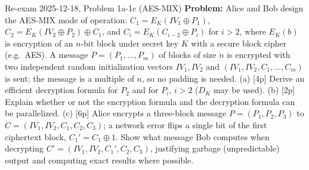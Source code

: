 \documentclass[12pt, a4paper]{article}
\begin{document}
\begin{practicebox}{Re-exam 2025-12-18, Problem 1a-1c (AES-MIX)}
\textbf{Problem:} Alice and Bob design the AES-MIX mode of operation: $C_1 = E_K(IV_1 \oplus P_1)$, $C_2 = E_K(IV_2 \oplus P_2) \oplus C_1$, and $C_i = E_K(C_{i-2} \oplus P_i)$ for $i > 2$, where $E_K(b)$ is encryption of an $n$-bit block under secret key $K$ with a secure block cipher (e.g.\ AES). A message $P = (P_1, \dots, P_m)$ of blocks of size $n$ is encrypted with two independent random initialization vectors $IV_1, IV_2$ and $(IV_1, IV_2, C_1, \dots, C_m)$ is sent; the message is a multiple of $n$, so no padding is needed. (a) [4p] Derive an efficient decryption formula for $P_2$ and for $P_i$, $i > 2$ ($D_K$ may be used). (b) [2p] Explain whether or not the encryption formula and the decryption formula can be parallelized. (c) [6p] Alice encrypts a three-block message $P = (P_1, P_2, P_3)$ to $C = (IV_1, IV_2, C_1, C_2, C_3)$; a network error flips a single bit of the first ciphertext block, $C_1' = C_1 \oplus 1$. Show what message Bob computes when decrypting $C' = (IV_1, IV_2, C_1', C_2, C_3)$, justifying garbage (unpredictable) output and computing exact results where possible.


\end{practicebox}
\end{document}
